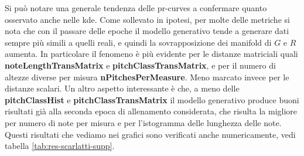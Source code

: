Si può notare una generale tendenza delle pr-curves a confermare quanto osservato anche nelle kde. Come sollevato in ipotesi, per molte delle metriche si nota che con il passare delle epoche il modello generativo tende a generare dati sempre più simili a quelli reali, e quindi la sovrapposizione dei manifold di \(G\) e \(R\) aumenta.
In particolare il fenomeno è più evidente per le distanze matriciali quali \textbf{noteLengthTransMatrix} e \textbf{pitchClassTransMatrix}, e per il numero di altezze diverse per misura \textbf{nPitchesPerMeasure}. Meno marcato invece per le distanze scalari.
Un altro aspetto interessante è che, a meno delle \textbf{pitchClassHist} e \textbf{pitchClassTransMatrix} il modello generativo produce buoni risultati già alla seconda epoca di allenamento considerata, che risulta la migliore per numero di note per misura e per l'istogramma delle lunghezza delle note.
Questi risultati che vediamo nei grafici sono verificati anche numericamente, vedi tabella \ref{tab:res-scarlatti-supp}.

